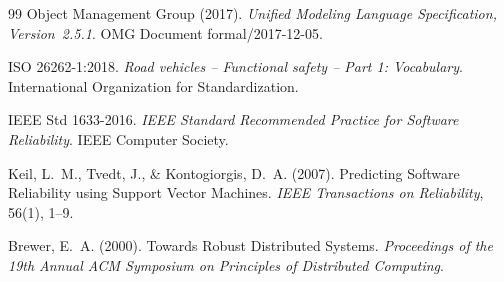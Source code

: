 \documentclass[a4paper,11pt]{article}
\theoremstyle{definition}
\begin{document}
\begin{thebibliography}{99}
    Object Management Group (2017).
    \textit{Unified Modeling Language Specification, Version~2.5.1}.
    OMG Document formal/2017-12-05.

    ISO 26262-1:2018.
    \textit{Road vehicles -- Functional safety -- Part 1: Vocabulary}.
    International Organization for Standardization.

    IEEE Std 1633-2016.
    \textit{IEEE Standard Recommended Practice for Software Reliability}.
    IEEE Computer Society.

    Keil, L.~M., Tvedt, J., \& Kontogiorgis, D.~A. (2007).
    Predicting Software Reliability using Support Vector Machines.
    \textit{IEEE Transactions on Reliability}, 56(1), 1--9.

    Brewer, E.~A. (2000).
    Towards Robust Distributed Systems.
    \textit{Proceedings of the 19th Annual ACM Symposium on Principles of Distributed Computing}.

\end{thebibliography}
\end{document}
